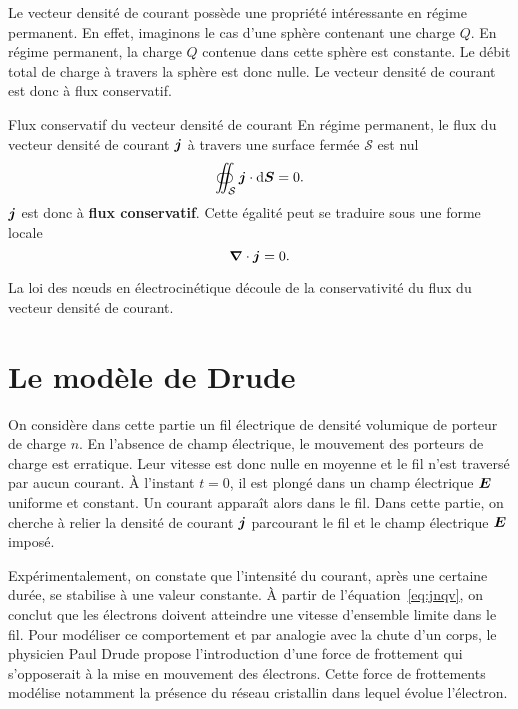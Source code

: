 Le vecteur densité de courant possède une propriété intéressante en régime 
permanent.
En effet, imaginons le cas d'une sphère contenant une charge $Q$. En régime permanent,
la charge $Q$ contenue dans cette sphère est constante. Le débit total de
charge à travers la sphère est donc nulle. Le vecteur densité de courant est donc 
à flux conservatif.

\begin{defn}{Flux conservatif du vecteur densité de courant}
	En régime permanent, le flux du vecteur densité de courant $\vecj$
	à travers une surface fermée $\mathcal{S}$ est nul
	\begin{equation*}
		\oiint_\mathcal{S} \vecj \cdot \ds = 0.
	\end{equation*}
	$\vecj$ est donc à \textbf{flux conservatif}. Cette égalité peut se traduire
	sous une forme locale
	\begin{equation*}
		\grad \cdot \vecj = 0.
	\end{equation*}
\end{defn}

\begin{rema}
	La loi des n\oe{}uds en électrocinétique découle de la conservativité du
	flux du vecteur densité de courant.
\end{rema}

\section{Le modèle de Drude}
On considère dans cette partie un fil électrique de densité volumique
de porteur de charge $n$. En l'absence de champ électrique, le mouvement
des porteurs de charge est erratique. Leur vitesse est donc nulle en moyenne
et le fil n'est traversé par aucun courant. À l'instant $t=0$, il est plongé dans 
un champ électrique $\vece$ uniforme et constant. Un courant apparaît alors dans 
le fil. Dans cette partie, on cherche
à relier la densité de courant $\vecj$ parcourant le fil et le champ électrique 
$\vece$ imposé.

Expérimentalement, on constate que l'intensité du courant, après une certaine durée,
se stabilise à une valeur constante. 
À partir de l'équation~\ref{eq:jnqv}, on conclut que les 
électrons doivent atteindre une vitesse d'ensemble limite dans le fil. Pour modéliser 
ce comportement et par analogie avec la chute d'un corps, 
le physicien Paul Drude propose l'introduction d'une force de frottement 
qui s'opposerait à la mise en mouvement des électrons. Cette force de 
frottements modélise notamment la présence du réseau cristallin dans lequel évolue 
l'électron. 

